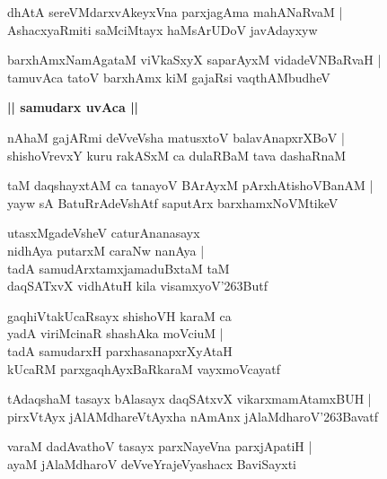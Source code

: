 \documentclass[twoside,12pt,openright]{book}
\def\S{\char'263}
\newcounter{shloka}[chapter]
\def\uvaca#1{\centerline{{\large\textbf{#1}}}}
\begin{document}
\begin{shloka}%
dhAtA sereVMdarxvAkeyxVna parxjagAma mahANaRvaM |\\
AshacxyaRmiti saMciMtayx haMsArUDoV javAdayxyw
\end{shloka}

\begin{shloka}%
barxhAmxNamAgataM viVkaSxyX saparAyxM vidadeVNBaRvaH |\\
tamuvAca tatoV barxhAmx kiM gajaRsi vaqthAMbudheV 
\end{shloka}

\uvaca{|| samudarx uvAca ||}

\begin{shloka}%
nAhaM gajARmi deVveVsha matusxtoV balavAnapxrXBoV |\\
shishoVrevxY kuru rakASxM ca dulaRBaM tava dashaRnaM 
\end{shloka}

\begin{shloka}%
taM daqshayxtAM ca tanayoV BArAyxM pArxhAtishoVBanAM |\\
yayw sA BatuRrAdeVshAtf saputArx barxhamxNoVMtikeV 
\end{shloka}

\begin{shloka}%
utasxMgadeVsheV caturAnanasayx \\
nidhAya putarxM caraNw nanAya |\\
tadA samudArxtamxjamaduBxtaM taM \\
daqSATxvX vidhAtuH kila visamxyoV\S Butf 
\end{shloka}

\begin{shloka}%
gaqhiVtakUcaRsayx shishoVH karaM ca \\
yadA viriMcinaR shashAka moVciuM |\\
tadA samudarxH parxhasanapxrXyAtaH \\
kUcaRM parxgaqhAyxBaRkaraM vayxmoVcayatf 
\end{shloka}

\begin{shloka}%
tAdaqshaM tasayx bAlasayx daqSAtxvX vikarxmamAtamxBUH |\\
pirxVtAyx jAlAMdhareVtAyxha nAmAnx jAlaMdharoV\S Bavatf
\end{shloka}

\begin{shloka}%
varaM dadAvathoV tasayx parxNayeVna parxjApatiH |\\
ayaM jAlaMdharoV deVveYrajeVyashacx BaviSayxti
\end{shloka}
\end{document}
